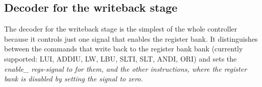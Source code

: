 \subsection{Decoder for the writeback stage}
The decoder for the writeback stage is the simplest of the whole controller because it controls just one signal that enables the register bank. It distinguishes between the commands that write back to the register bank bank (currently supported: LUI, ADDIU, LW, LBU, SLTI, SLT, ANDI, ORI) and sets the \em enable\_ regs\em -signal to for them, and the other instructions, where the register bank is disabled by setting the signal to zero. 